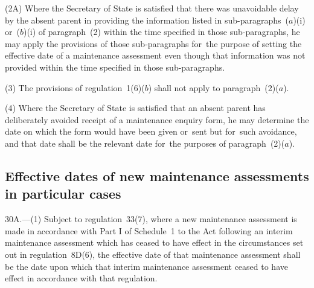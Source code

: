 \documentclass[a4paper,12pt]{article}
\begin{document}
(2A) Where 
the Secretary of State  %
is satisfied that there was unavoidable delay by the absent parent in providing the information listed in sub-paragraphs~($a$)(i) or~($b$)(i) of paragraph~(2) within the time specified in those sub-paragraphs, he may apply the provisions of those sub-paragraphs for~the purpose of setting the effective date of a maintenance assessment even though that information was not provided within the time specified in those sub-paragraphs.

(3) The provisions of regulation~1(6)($b$) shall not apply to paragraph~(2)($a$).

(4) Where 
the Secretary of State  %
is satisfied that an absent parent has deliberately avoided receipt of a maintenance enquiry form, he may determine the date on which the form would have been given or~sent but for~such avoidance, and that date shall be the relevant date for~the purposes of paragraph~(2)($a$).


\subsection[30A. Effective dates of new maintenance assessments in particular cases]{Effective dates of new maintenance assessments in particular cases}

30A.—(1) Subject to regulation~33(7), where a new maintenance assessment is made in accordance with Part I of Schedule~1 to the Act following an interim maintenance assessment which has ceased to have effect in the circumstances set out in regulation~8D(6), the effective date of that maintenance assessment shall be the date upon which that interim maintenance assessment ceased to have effect in accordance with that regulation.
\end{document}
